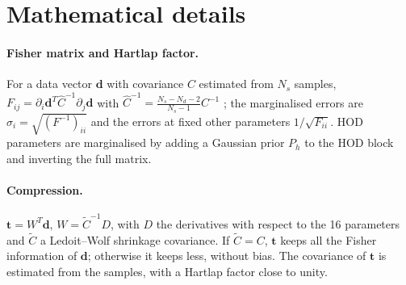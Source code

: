 \documentclass[11pt,twocolumn]{article}
\begin{document}
\section{Mathematical details}
\label{app:maths}

\paragraph{Fisher matrix and Hartlap factor.} For a data vector $\boldsymbol d$ with covariance $C$ estimated from $N_s$ samples, $F_{ij} = \partial_i\boldsymbol d^T \hat C^{-1}\partial_j\boldsymbol d$ with $\hat C^{-1} = \frac{N_s-N_d-2}{N_s-1}C^{-1}$ \cite{Hartlap2007}; the marginalised errors are $\sigma_i=\sqrt{(F^{-1})_{ii}}$ and the errors at fixed other parameters $1/\sqrt{F_{ii}}$. HOD parameters are marginalised by adding a Gaussian prior $P_h$ to the HOD block and inverting the full matrix.

\paragraph{Compression.} $\boldsymbol t = W^T\boldsymbol d$, $W=\tilde C^{-1}D$, with $D$ the derivatives with respect to the 16 parameters and $\tilde C$ a Ledoit--Wolf shrinkage covariance. If $\tilde C=C$, $\boldsymbol t$ keeps all the Fisher information of $\boldsymbol d$; otherwise it keeps less, without bias. The covariance of $\boldsymbol t$ is estimated from the samples, with a Hartlap factor close to unity.
\end{document}
